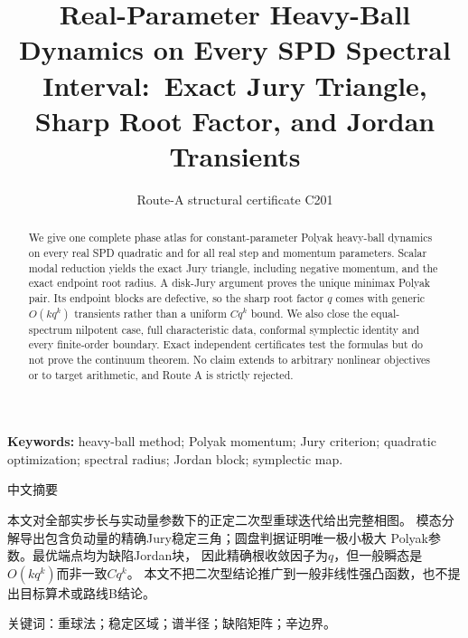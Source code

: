 \documentclass[9pt]{extarticle}
\title{Real-Parameter Heavy-Ball Dynamics on Every SPD Spectral Interval:\
Exact Jury Triangle, Sharp Root Factor, and Jordan Transients}
\author{Route-A structural certificate C201}
\date{}
\begin{document}
\maketitle
\begin{abstract}
We give one complete phase atlas for constant-parameter Polyak heavy-ball
dynamics on every real SPD quadratic and for all real step and momentum
parameters.  Scalar modal reduction yields the exact Jury triangle, including
negative momentum, and the exact endpoint root radius.  A disk-Jury argument
proves the unique minimax Polyak pair.  Its endpoint blocks are defective, so
the sharp root factor $q$ comes with generic $O(kq^k)$ transients rather than a
uniform $Cq^k$ bound.  We also close the equal-spectrum nilpotent case, full
characteristic data, conformal symplectic identity and every finite-order
boundary.  Exact independent certificates test the formulas but do not prove
the continuum theorem.  No claim extends to arbitrary nonlinear objectives or
to target arithmetic, and Route A is strictly rejected.
\end{abstract}
\noindent\textbf{Keywords:} heavy-ball method; Polyak momentum; Jury criterion;
quadratic optimization; spectral radius; Jordan block; symplectic map.

\begin{otherlanguage}{chinese-simplified}
\begin{center}{\large 中文摘要}\end{center}
本文对全部实步长与实动量参数下的正定二次型重球迭代给出完整相图。
模态分解导出包含负动量的精确\foreignlanguage{english}{Jury}稳定三角；圆盘判据证明唯一极小极大
\foreignlanguage{english}{Polyak}参数。最优端点均为缺陷\foreignlanguage{english}{Jordan}块，
因此精确根收敛因子为$q$，但一般瞬态是$O(kq^k)$而非一致$Cq^k$。
本文不把二次型结论推广到一般非线性强凸函数，也不提出目标算术或路线\foreignlanguage{english}{B}结论。

\noindent 关键词：重球法；稳定区域；谱半径；缺陷矩阵；辛边界。
\end{otherlanguage}
\end{document}

